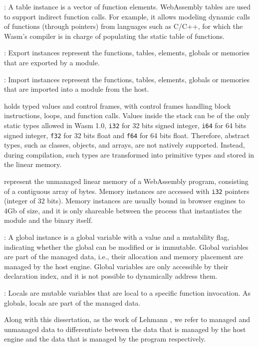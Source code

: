 : A table instance is a vector of function elements. 
WebAssembly tables are used to support indirect function calls.
For example, it allows modeling dynamic calls of functions (through pointers) from languages such as C/C++, for which the Wasm's compiler is in charge of populating the static table of functions.


: Export instances represent the functions, tables, elements, globals or memories that are exported by a module. 

: Import instances represent the functions, tables, elements, globals or memories that are imported into a module from the host. 

 holds typed values and control frames, with control frames handling block instructions, loops, and function calls.
Values inside the stack can be of the only static types allowed in Wasm 1.0, \texttt{i32} for 32 bits signed integer, \texttt{i64} for 64 bits signed integer, \texttt{f32} for 32 bits float and \texttt{f64} for 64 bits float.
Therefore, abstract types, such as classes, objects, and arrays, are not natively supported. 
Instead, during compilation, such types are transformed into primitive types and stored in the linear memory.

 represent the unmanaged linear memory of a WebAssembly program, consisting of a contiguous array of bytes.
Memory instances are accessed with \texttt{i32} pointers (integer of 32 bits). 
Memory instances are usually bound in browser engines to 4Gb of size, and it is only shareable between the process that instantiates the \Wasm module and the binary itself.

: A global instance is a global variable with a value and a mutability flag, indicating whether the global can be modified or is immutable.
Global variables are part of the managed data, i.e., their allocation and memory placement are managed by the host engine.
Global variables are only accessible by their declaration index, and it is not possible to dynamically address them. 


: Locals are mutable variables that are local to a specific function invocation. As globals, locals are part of the managed data.

\begin{note}\label{managed_unmanaged}
    Along with this dissertation, as the work of Lehmann \etal \cite{usenixWasm2020}, we refer to managed and unmanaged data to differentiate between the data that is managed by the host engine and the data that is managed by the \Wasm program respectively.
\end{note}

